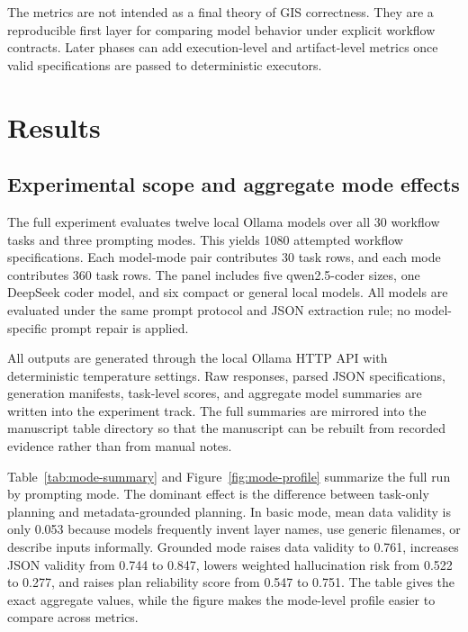 \documentclass[12pt]{gsis}  %
\begin{document}
The metrics are not intended as a final theory of GIS correctness. They are a reproducible first layer for comparing model behavior under explicit workflow contracts. Later phases can add execution-level and artifact-level metrics once valid specifications are passed to deterministic executors.

\section{Results}

\subsection{Experimental scope and aggregate mode effects}

The full experiment evaluates twelve local Ollama models over all 30 workflow tasks and three prompting modes. This yields 1080 attempted workflow specifications. Each model-mode pair contributes 30 task rows, and each mode contributes 360 task rows. The panel includes five qwen2.5-coder sizes, one DeepSeek coder model, and six compact or general local models. All models are evaluated under the same prompt protocol and JSON extraction rule; no model-specific prompt repair is applied.

All outputs are generated through the local Ollama HTTP API with deterministic temperature settings. Raw responses, parsed JSON specifications, generation manifests, task-level scores, and aggregate model summaries are written into the experiment track. The full summaries are mirrored into the manuscript table directory so that the manuscript can be rebuilt from recorded evidence rather than from manual notes.

Table~\ref{tab:mode-summary} and Figure~\ref{fig:mode-profile} summarize the full run by prompting mode. The dominant effect is the difference between task-only planning and metadata-grounded planning. In basic mode, mean data validity is only 0.053 because models frequently invent layer names, use generic filenames, or describe inputs informally. Grounded mode raises data validity to 0.761, increases JSON validity from 0.744 to 0.847, lowers weighted hallucination risk from 0.522 to 0.277, and raises plan reliability score from 0.547 to 0.751. The table gives the exact aggregate values, while the figure makes the mode-level profile easier to compare across metrics.
\end{document}
